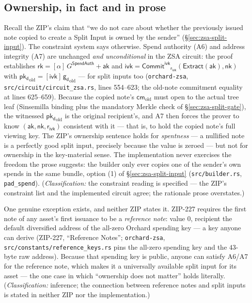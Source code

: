 \documentclass[11pt,a4paper]{article}
\theoremstyle{definition}
\newcommand{\cmsym}{\mathsf{cm}}
\newcommand{\rk}{\mathsf{rk}}
\newcommand{\CommitIvk}{\ensuremath{\mathsf{Commit}^{\mathsf{ivk}}}}
\newcommand{\Extract}{\ensuremath{\mathsf{Extract}}}
\newcommand{\aksym}{\ensuremath{\mathsf{ak}}}
\newcommand{\nksym}{\ensuremath{\mathsf{nk}}}
\newcommand{\ivk}{\ensuremath{\mathsf{ivk}}}
\newcommand{\pkd}{\ensuremath{\mathsf{pk_d}}}
\newcommand{\gd}{\ensuremath{\mathsf{g_d}}}
\newcommand{\rivk}{\ensuremath{\mathsf{r_{ivk}}}}
\begin{document}
\subsection{Ownership, in fact and in prose}\label{sec:zsa-split-ownership}

Recall the ZIP's claim that ``we do not care about whether the previously
issued note copied to create a Split Input is owned by the sender''
(\S\ref{sec:zsa-split-input}). The constraint system says otherwise.
Spend authority (A6) and address integrity (A7) are unchanged \emph{and
unconditional} in the ZSA circuit: the proof establishes
$\rk = [\alpha]\,G^{\mathsf{SpendAuth}} + \aksym$ and
$\ivk = \CommitIvk_{\rivk}(\Extract(\aksym), \nksym)$ with
$\pkd_{\mathrm{old}} = [\ivk]\,\gd_{\mathrm{old}}$ --- for split inputs
too (\texttt{orchard-zsa}, \texttt{src/circuit/circuit\_zsa.rs}, lines
554--623; the old-note commitment equality at lines 625--659). Because
the copied note's $\cmsym_{\mathrm{old}}$ must open to the actual tree
leaf (Sinsemilla binding plus the mandatory Merkle check of
\S\ref{sec:zsa-split-gate}), the witnessed $\pkd_{\mathrm{old}}$ is the
original recipient's, and A7 then forces the prover to know $(\aksym,
\nksym, \rivk)$ consistent with it --- that is, to hold the copied note's
full viewing key. The ZIP's ownership sentence holds for \emph{spentness}
--- a nullified note is a perfectly good split input, precisely because
the value is zeroed --- but not for ownership in the key-material sense.
The implementation never exercises the freedom the prose suggests: the
builder only ever copies one of the sender's own spends in the same
bundle, option (1) of \S\ref{sec:zsa-split-input}
(\texttt{src/builder.rs}, \texttt{pad\_spend}). (\emph{Classification:}
the constraint reading is specified --- the ZIP's constraint list and the
implemented circuit agree; the rationale prose overstates.)

One genuine exception exists, and neither ZIP states it. ZIP-227 requires
the first note of any asset's first issuance to be a \emph{reference
note}: value $0$, recipient the default diversified address of the
all-zero Orchard spending key --- a key anyone can derive (ZIP-227,
``Reference Notes''; \texttt{orchard-zsa},
\texttt{src/constants/reference\_keys.rs} pins the all-zero spending key
and the $43$-byte raw address). Because that spending key is public,
anyone can satisfy A6/A7 for the reference note, which makes it a
universally available split input for its asset --- the one case in which
``ownership does not matter'' holds literally. (\emph{Classification:}
inference; the connection between reference notes and split inputs is
stated in neither ZIP nor the implementation.)
\end{document}
